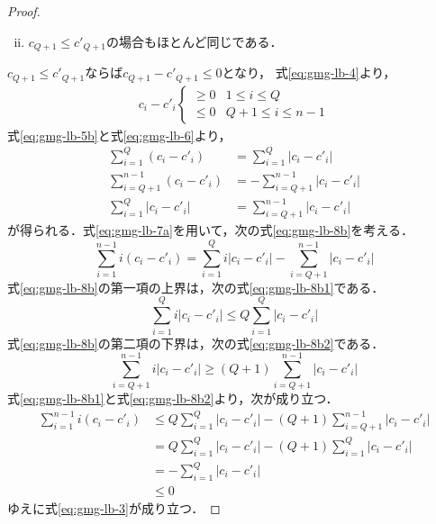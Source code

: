 \begin{proof}
  \begin{enumerate}[(i)]
    \setcounter{enumi}{1}
  \item $c_{Q+1}\leq c'_{Q+1}$の場合もほとんど同じである．
  \end{enumerate}
  $c_{Q+1}\leq c'_{Q+1}$ならば$c_{Q+1}-c'_{Q+1}\leq0$となり，
  式\ref{eq:gmg-lb-4}より，
  \begin{equation}
    \label{eq:gmg-lb-5b}
    \begin{aligned}
      c_i-c'_i
      \begin{cases}
        \geq 0 & 1\leq i\leq Q \\
        \leq 0 & Q+1\leq i\leq n-1
      \end{cases}
    \end{aligned}
  \end{equation}
  式\ref{eq:gmg-lb-5b}と式\ref{eq:gmg-lb-6}より，
  \begin{equation}
    \label{eq:gmg-lb-7b}
    \begin{aligned}
      \sum_{i=1}^{Q}(c_i-c'_i) &= \sum_{i=1}^{Q}|c_i-c'_i| \\
      \sum_{i=Q+1}^{n-1}(c_i-c'_i) &= -\sum_{i=Q+1}^{n-1}|c_i-c'_i| \\
      \sum_{i=1}^{Q}|c_i-c'_i| &= \sum_{i=Q+1}^{n-1}|c_i-c'_i|
    \end{aligned}
  \end{equation}
  が得られる．式\ref{eq:gmg-lb-7a}を用いて，次の式\ref{eq:gmg-lb-8b}を考える．
  \begin{equation}
    \label{eq:gmg-lb-8b}
    \sum_{i=1}^{n-1}i(c_i-c'_i)=
    \sum_{i=1}^{Q}i|c_i-c'_i|-\sum_{i=Q+1}^{n-1}|c_i-c'_i|
  \end{equation}
  式\ref{eq:gmg-lb-8b}の第一項の上界は，次の式\ref{eq:gmg-lb-8b1}である．
  \begin{equation}
    \label{eq:gmg-lb-8b1}
    \sum_{i=1}^{Q}i|c_i-c'_i|\leq Q\sum_{i=1}^{Q}|c_i-c'_i|
  \end{equation}
  式\ref{eq:gmg-lb-8b}の第二項の下界は，次の式\ref{eq:gmg-lb-8b2}である．
  \begin{equation}
    \label{eq:gmg-lb-8b2}
    \sum_{i=Q+1}^{n-1}i|c_i-c'_i|\geq (Q+1)\sum_{i=Q+1}^{n-1}|c_i-c'_i|
  \end{equation}
  式\ref{eq:gmg-lb-8b1}と式\ref{eq:gmg-lb-8b2}より，次が成り立つ．
  \begin{align*}
    \sum_{i=1}^{n-1}i(c_i-c'_i)
    &\leq Q\sum_{i=1}^{Q}|c_i-c'_i|-(Q+1)\sum_{i=Q+1}^{n-1}|c_i-c'_i| \\
    &= Q\sum_{i=1}^{Q}|c_i-c'_i|-(Q+1)\sum_{i=1}^{Q}|c_i-c'_i| \\
    &= -\sum_{i=1}^{Q}|c_i-c'_i| \\
    &\leq 0
  \end{align*}
  ゆえに式\ref{eq:gmg-lb-3}が成り立つ．
\end{proof}

